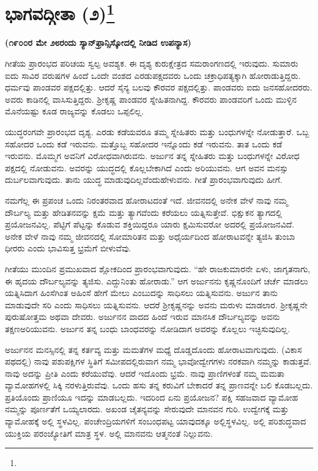 
\chapter{ಭಾಗವದ್ಗೀತಾ (೨)\protect\footnote{\engfoot{}}}

\centerline{\textbf{(೧೯೦೦ರ ಮೇ ೨೮ರಂದು ಸ್ಯಾನ್​ಫ್ರಾನ್ಸಿಸ್ಕೋದಲ್ಲಿ ನೀಡಿದ ಉಪನ್ಯಾಸ)}}

ಗೀತೆಯ ಪ್ರಾರಂಭದ ಪರಿಚಯ ಸ್ವಲ್ಪ ಅವಶ್ಯಕ. ಈ ದೃಶ್ಯ ಕುರುಕ್ಷೇತ್ರದ ಸಮರಾಂಗಣದಲ್ಲಿ ಇರುವುದು. ಸುಮಾರು ಐದು ಸಾವಿರ ವರುಷಗಳ ಹಿಂದೆ ಒಂದೇ ವಂಶದ ಎರಡು\break ಪಕ್ಷದವರು ಒಂದು ಚಕ್ರಾಧಿಪತ್ಯಕ್ಕಾಗಿ ಹೋರಾಡುತ್ತಿದ್ದರು. ಧರ್ಮವು ಪಾಂಡ\-ವರ ಪಕ್ಷದಲ್ಲಿತ್ತು. ಆದರೆ ಸೈನ್ಯ ಬಲವು ಕೌರವರ ಪಕ್ಷದಲ್ಲಿತ್ತು. ಪಾಂಡವರು ಐದು ಜನ\break ಸಹೋದರರು. ಅವರು ಕಾಡಿನಲ್ಲಿ ವಾಸಿಸುತ್ತಿದ್ದರು. ಶ‍್ರೀಕೃಷ್ಣ ಪಾಂಡವರ ಸ್ನೇಹಿತನಾಗಿದ್ದ. ಕೌರವರು ಪಾಂಡವರಿಗೆ ಒಂದು ಮುಳ್ಳಿನ ಮೊನೆಯಷ್ಟು ಕೂಡ ರಾಜ್ಯವನ್ನು ಕೊಡಲು ಒಪ್ಪಲಿಲ್ಲ.

ಯುದ್ಧರಂಗವೇ ಪ್ರಾರಂಭದ ದೃಶ್ಯ. ಎರಡು ಕಡೆಯವರೂ ತಮ್ಮ ಸ್ನೇಹಿತರು ಮತ್ತು ಬಂಧುಗಳನ್ನೇ ನೋಡುತ್ತಾರೆ. ಒಬ್ಬ ಸಹೋದರ ಒಂದು ಕಡೆ ಇರುವನು. ಮತ್ತೊಬ್ಬ ಸಹೋದರ ಇನ್ನೊಂದು ಕಡೆ ಇರುವನು. ತಾತ ಒಂದು ಕಡೆ ಇರುವನು. ಮೊಮ್ಮಗ ಅವನಿಗೆ ವಿರೋಧವಾಗಿರುವನು. ಅರ್ಜುನ ತನ್ನ ಸ್ನೇಹಿತರು ಮತ್ತು ಬಂಧುಗಳನ್ನೇ ವಿರೋಧ ಪಕ್ಷದಲ್ಲಿ ನೋಡುವನು. ಅವರನ್ನು ಯುದ್ಧದಲ್ಲಿ ಕೊಲ್ಲಬೇಕಾಗಿದೆ ಎಂದು ಅರಿಯುವನು. ಆಗ ಅವನ ಮನಸ್ಸು ದುರ್ಬಲವಾಗುವುದು. ತಾನು ಯುದ್ಧ ಮಾಡುವುದಿಲ್ಲವೆಂದು\break ಹೇಳುವನು. ಗೀತೆ ಪ್ರಾರಂಭವಾಗುವುದು ಹೀಗೆ.

ನಮಗೆಲ್ಲ ಈ ಪ್ರಪಂಚ ಒಂದು ನಿರಂತರವಾದ ಹೋರಾಟದಂತೆ ಇದೆ. ಜೀವನದಲ್ಲಿ ಅನೇಕ ವೇಳೆ ನಾವು ನಮ್ಮ ದೌರ್ಬಲ್ಯ ಮತ್ತು ಹೇಡಿತನವನ್ನು ಕ್ಷಮೆ ಮತ್ತು ತ್ಯಾಗವೆಂದು ಕರೆಯಲು ಯತ್ನಿಸುತ್ತೇವೆ. ಭಿಕ್ಷುಕನ ತ್ಯಾಗದಲ್ಲಿ ಪ್ರಯೋಜನವಿಲ್ಲ. ಪೆಟ್ಟಿಗೆ ಪೆಟ್ಟನ್ನು ಕೊಡುವ ಶಕ್ತಿಯಿದ್ದರೂ ಯಾರು ಕ್ಷಮಿಸುವರೋ ಅದರಲ್ಲಿ ಪ್ರಯೋಜನವಿದೆ. ಅನೇಕ ವೇಳೆ ನಾವು ನಮ್ಮ ಜೀವನದಲ್ಲಿ ಸೋಮಾರಿತನ ಮತ್ತು ಅಧೈರ್ಯದಿಂದ ಹೋರಾಟವನ್ನೇ ತ್ಯಜಿಸಿ ತುಂಬಾ ಧೀರರು ಎಂದು ಭಾವಿಸುತ್ತ ಭ್ರಮೆಗೆ ಬೀಳುವೆವು.

ಗೀತೆಯು ಮುಂದಿನ ಪ್ರಮುಖವಾದ ಶ್ಲೋಕದಿಂದ ಪ್ರಾರಂಭವಾಗುವುದು. “ಹೇ ರಾಜಕುಮಾರನೇ ಏಳು, ಜಾಗೃತನಾಗು, ಈ ಹೃದಯ ದೌರ್ಬಲ್ಯವನ್ನು ತ್ಯಜಿಸು. ಎದ್ದುನಿಂತು ಹೋರಾಡು.” ಆಗ ಅರ್ಜುನನು ಕೃಷ್ಣನೊಂದಿಗೆ ಚರ್ಚೆ ಮಾಡಲು ಯತ್ನಿಸಿದಾಗ ಹಿಂಸೆಗಿಂತ ಅಹಿಂಸೆ ಹೇಗೆ ಮೇಲು ಎಂಬುದನ್ನು ಸಾಧಿಸಲು ಯತ್ನಿಸುವನು. ಅರ್ಜುನ ತಾನು ಮಾಡುವುದೇ ಸರಿ ಎಂದು ಸಾಧಿಸಲು ಯತ್ನಿಸುವನು. ಆದರೆ ಶ‍್ರೀಕೃಷ್ಣನನ್ನು ಅವನು ಮರುಳು ಮಾಡಲಾರ. ಶ‍್ರೀಕೃಷ್ಣನೇ ಪುರುಷೋತ್ತಮ ಅಥವಾ ದೇವರು. ಅರ್ಜುನನ ವಾದದ ಹಿಂದೆ ಇರುವ ಮಾನಸಿಕ ದೌರ್ಬಲ್ಯವನ್ನು ಅವನು ತಕ್ಷಣ\break ಅರಿಯುವನು. ಅರ್ಜುನ ತನ್ನ ಬಂಧು ಬಾಂಧವರನ್ನು ನೋಡಿದಾಗ ಅವರನ್ನು ಕೊಲ್ಲಲು ಇಚ್ಛಿಸುವುದಿಲ್ಲ.

ಅರ್ಜುನನ ಮನಸ್ಸಿನಲ್ಲಿ ತನ್ನ ಕರ್ತವ್ಯ ಮತ್ತು ಮಮತೆಗಳ ಮಧ್ಯೆ ದೊಡ್ಡದೊಂದು ಹೋರಾಟವಾಗುವುದು. (ವಿಕಾಸ ಪಥದಲ್ಲಿ) ನಾವು ಪಶುಪಕ್ಷಿಗಳ ಸ್ಥಿತಿಗೆ ಸಮೀಪದಲ್ಲಿರುವಾಗ ನಮ್ಮ ಭಾವೋದ್ವೇಗಗಳು ನರಕವಾಗಿ ನಮ್ಮನ್ನು ಕಾಡುತ್ತವೆ. ನಾವು ಅದನ್ನು ಪ್ರೀತಿ ಎಂದು ಕರೆಯುವೆವು. ಆದರೆ ಇದೊಂದು ಭ್ರಮೆ. ನಾವು ಪ್ರಾಣಿಗಳಂತೆ ನಮ್ಮ ಮಮತಾ ವ್ಯಾಮೋಹಗಳಲ್ಲಿ ಸಿಕ್ಕಿ ನರಳುತ್ತಿರುವೆವು. ಒಂದು ಹಸು ತನ್ನ ಕರುವಿಗೆ ಬೇಕಾದರೆ ತನ್ನ ಪ್ರಾಣವನ್ನೇ ಬಲಿ ಕೊಡಬಲ್ಲದು. ಪ್ರತಿಯೊಂದು ಪ್ರಾಣಿಯೂ ಇದನ್ನು ಮಾಡಬಲ್ಲದು. ಇದರಿಂದ ಏನು ಪ್ರಯೋಜನ? ಪಕ್ಷಿ ಸಹಜವಾದ ವ್ಯಾಮೋಹ ನಮ್ಮನ್ನು ಪೂರ್ಣತೆಗೆ ಒಯ್ಯಲಾರದು. ಅಖಂಡ ಚೈತನ್ಯವನ್ನು ಸೇರುವುದೇ ಮಾನವನ ಗುರಿ. ಉದ್ವೇಗಕ್ಕೆ ಮತ್ತು ವ್ಯಾಮೋಹಕ್ಕೆ ಅಲ್ಲಿ ಸ್ಥಳವಿಲ್ಲ. ಪಂಚೇಂದ್ರಿಯಗಳಿಗೆ ಸಂಬಂಧಪಟ್ಟ ಯಾವುದಕ್ಕೂ ಅಲ್ಲಿ\break ಸ್ಥಳವಿಲ್ಲ. ಅಲ್ಲಿ ಪರಿಶುದ್ಧವಾದ ಯುಕ್ತಿಯ ಪರಂಜ್ಯೋತಿಗೆ ಮಾತ್ರ ಸ್ಥಳ. ಅಲ್ಲಿ ಮಾನವನು ಆತ್ಮನಂತೆ ನಿಲ್ಲುವನು.

